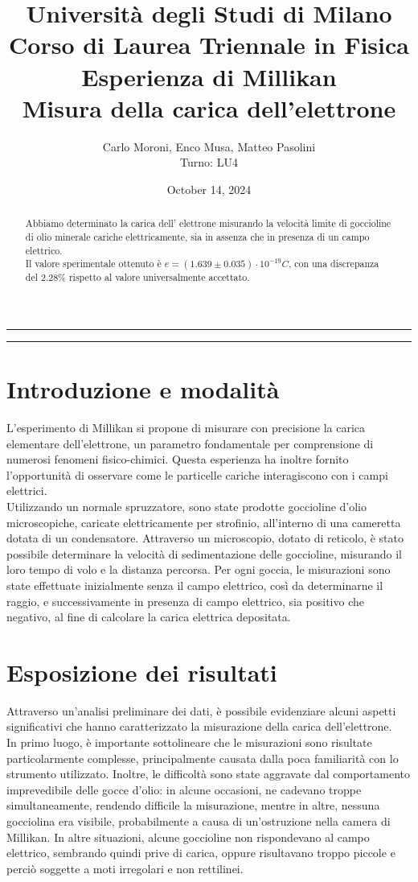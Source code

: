 \documentclass{article}
\title{{\large Università degli Studi di Milano}\\{\large Corso di Laurea Triennale in Fisica}\\{\LARGE Esperienza di Millikan}\\{\normalsize Misura della carica dell'elettrone}}
\author{Carlo Moroni, Enco Musa, Matteo Pasolini\\{Turno: LU4}}
\date{October 14, 2024}
\begin{document}
	
\maketitle
\hrule
\begin{abstract}
	Abbiamo determinato la carica dell' elettrone misurando la velocità limite di goccioline di olio minerale cariche elettricamente, sia in assenza che in presenza di un campo elettrico.\\
	Il valore sperimentale ottenuto è $e=(1.639 \pm 0.035)\cdot10^{-19} C$, con una discrepanza del 2.28\% rispetto al valore universalmente accettato. 
\end{abstract}
\hrule

\section{Introduzione e modalità}

L'esperimento di Millikan si propone di misurare con precisione la carica elementare dell'elettrone, un parametro fondamentale per comprensione di numerosi fenomeni fisico-chimici. Questa esperienza ha inoltre fornito l'opportunità di osservare come le particelle cariche interagiscono con i campi elettrici.\\

Utilizzando un normale spruzzatore, sono state prodotte goccioline d'olio microscopiche, caricate elettricamente per strofinio, all'interno di una cameretta dotata di un condensatore. Attraverso un microscopio, dotato di reticolo, è stato possibile determinare la velocità di sedimentazione delle goccioline, misurando il loro tempo di volo e la distanza percorsa. Per ogni goccia, le misurazioni sono state effettuate inizialmente senza il campo elettrico, così da determinarne il raggio, e successivamente in presenza di campo elettrico, sia positivo che negativo, al fine di calcolare la carica elettrica depositata.

\section{Esposizione dei risultati}

Attraverso un'analisi preliminare dei dati, è possibile evidenziare alcuni aspetti significativi che hanno caratterizzato la misurazione della carica dell'elettrone.\\ 

In primo luogo, è importante sottolineare che le misurazioni sono risultate particolarmente complesse, principalmente causata dalla poca familiarità con lo strumento utilizzato. Inoltre, le difficoltà sono state aggravate dal comportamento imprevedibile delle gocce d'olio: in alcune occasioni, ne cadevano troppe simultaneamente, rendendo difficile la misurazione, mentre in altre, nessuna gocciolina era visibile, probabilmente a causa di un'ostruzione nella camera di Millikan. In altre situazioni, alcune goccioline non rispondevano al campo elettrico, sembrando quindi prive di carica, oppure risultavano troppo piccole e perciò soggette a moti irregolari e non rettilinei.\\
\end{document}
